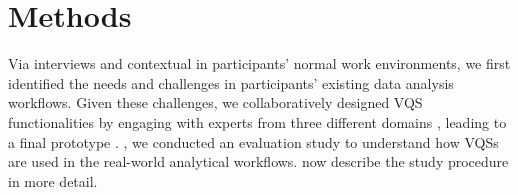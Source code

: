   \section{Methods\label{sec:methods}}
  Via interviews and contextual  in participants' normal work environments, we first identified the needs and challenges in participants' existing data analysis workflows. Given these challenges, we collaboratively designed VQS functionalities by engaging with experts from three different domains , leading to a final prototype \zvpp. , we conducted an evaluation study to understand how VQSs are used in the real-world analytical workflows. now describe the study procedure in more detail.
